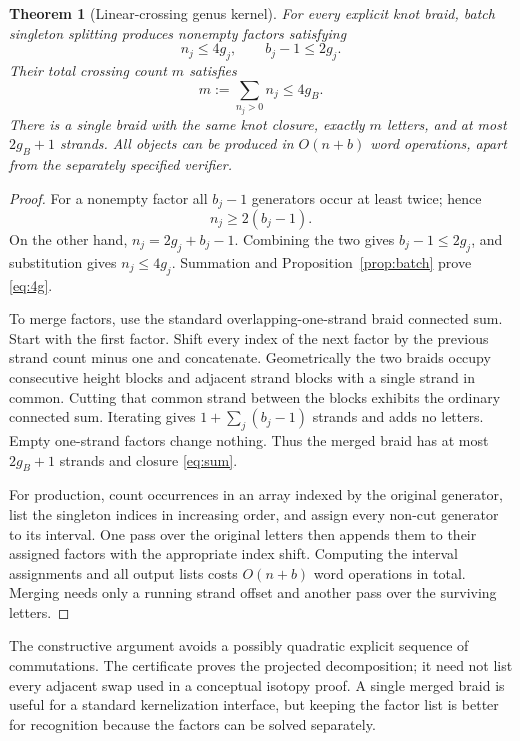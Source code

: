 \documentclass[11pt,letterpaper]{article}
\newtheorem{theorem}{Theorem}[section]
\theoremstyle{definition}
\begin{document}
\begin{theorem}[Linear-crossing genus kernel]
\label{thm:genus}
For every explicit knot braid, batch singleton splitting produces nonempty factors satisfying
\begin{equation}
 n_j\le4g_j,\qquad b_j-1\le2g_j.
 \label{eq:localgenus}
\end{equation}
Their total crossing count $m$ satisfies
\begin{equation}
 m:=\sum_{n_j>0}n_j\le4g_B.
 \label{eq:4g}
\end{equation}
There is a single braid with the same knot closure, exactly $m$ letters, and at most $2g_B+1$ strands. All objects can be produced in $O(n+b)$ word operations, apart from the separately specified verifier.
\end{theorem}
\begin{proof}
For a nonempty factor all $b_j-1$ generators occur at least twice; hence
\[
 n_j\ge2(b_j-1).
\]
On the other hand, $n_j=2g_j+b_j-1$. Combining the two gives $b_j-1\le2g_j$, and substitution gives $n_j\le4g_j$. Summation and Proposition~\ref{prop:batch} prove \eqref{eq:4g}.

To merge factors, use the standard overlapping-one-strand braid connected sum. Start with the first factor. Shift every index of the next factor by the previous strand count minus one and concatenate. Geometrically the two braids occupy consecutive height blocks and adjacent strand blocks with a single strand in common. Cutting that common strand between the blocks exhibits the ordinary connected sum. Iterating gives $1+\sum_j(b_j-1)$ strands and adds no letters. Empty one-strand factors change nothing. Thus the merged braid has at most $2g_B+1$ strands and closure \eqref{eq:sum}.

For production, count occurrences in an array indexed by the original generator, list the singleton indices in increasing order, and assign every non-cut generator to its interval. One pass over the original letters then appends them to their assigned factors with the appropriate index shift. Computing the interval assignments and all output lists costs $O(n+b)$ word operations in total. Merging needs only a running strand offset and another pass over the surviving letters.
\end{proof}

The constructive argument avoids a possibly quadratic explicit sequence of commutations. The certificate proves the projected decomposition; it need not list every adjacent swap used in a conceptual isotopy proof. A single merged braid is useful for a standard kernelization interface, but keeping the factor list is better for recognition because the factors can be solved separately.
\end{document}
